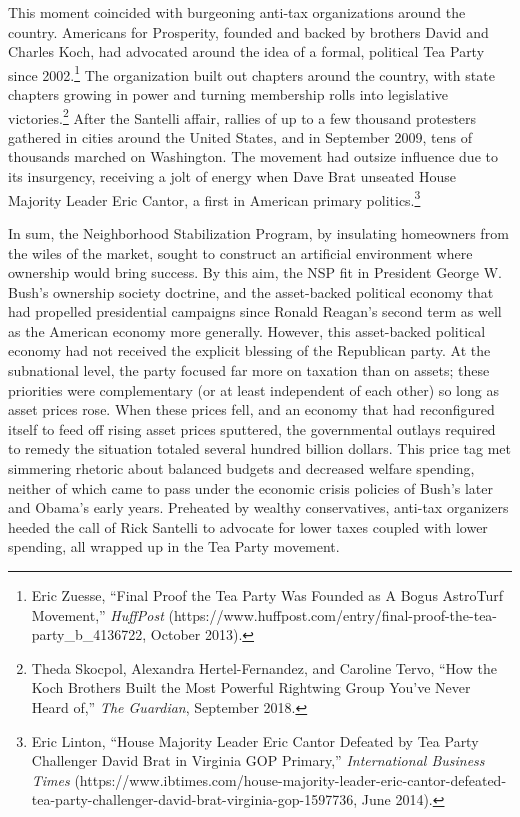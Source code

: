 \documentclass[12pt,oneside]{psthesis}
\begin{document}
This moment coincided with burgeoning anti-tax organizations around the country.
Americans for Prosperity, founded and backed by brothers David and Charles Koch, had advocated around the idea of a formal, political Tea Party since 2002.\footnote{Eric Zuesse, ``Final Proof the Tea Party Was Founded as A Bogus AstroTurf Movement,'' \emph{HuffPost} (https://www.huffpost.com/entry/final-proof-the-tea-party\_b\_4136722, October 2013).}
The organization built out chapters around the country, with state chapters growing in power and turning membership rolls into legislative victories.\footnote{Theda Skocpol, Alexandra Hertel-Fernandez, and Caroline Tervo, ``How the Koch Brothers Built the Most Powerful Rightwing Group You've Never Heard of,'' \emph{The Guardian}, September 2018.}
After the Santelli affair, rallies of up to a few thousand protesters gathered in cities around the United States, and in September 2009, tens of thousands marched on Washington.
The movement had outsize influence due to its insurgency, receiving a jolt of energy when Dave Brat unseated House Majority Leader Eric Cantor, a first in American primary politics.\footnote{Eric Linton, ``House Majority Leader Eric Cantor Defeated by Tea Party Challenger David Brat in Virginia GOP Primary,'' \emph{International Business Times} (https://www.ibtimes.com/house-majority-leader-eric-cantor-defeated-tea-party-challenger-david-brat-virginia-gop-1597736, June 2014).}

In sum, the Neighborhood Stabilization Program, by insulating homeowners from the wiles of the market, sought to construct an artificial environment where ownership would bring success.
By this aim, the NSP fit in President George W. Bush's ownership society doctrine, and the asset-backed political economy that had propelled presidential campaigns since Ronald Reagan's second term as well as the American economy more generally.
However, this asset-backed political economy had not received the explicit blessing of the Republican party.
At the subnational level, the party focused far more on taxation than on assets; these priorities were complementary (or at least independent of each other) so long as asset prices rose.
When these prices fell, and an economy that had reconfigured itself to feed off rising asset prices sputtered, the governmental outlays required to remedy the situation totaled several hundred billion dollars.
This price tag met simmering rhetoric about balanced budgets and decreased welfare spending, neither of which came to pass under the economic crisis policies of Bush's later and Obama's early years.
Preheated by wealthy conservatives, anti-tax organizers heeded the call of Rick Santelli to advocate for lower taxes coupled with lower spending, all wrapped up in the Tea Party movement.
\end{document}
